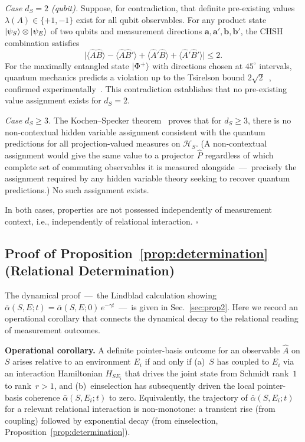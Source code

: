 \textit{Case $d_S = 2$ (qubit).}
Suppose, for contradiction, that definite pre-existing values
$\lambda(A) \in \{+1,-1\}$ exist for all qubit observables.
For any product state $\ket{\psi_S}\otimes\ket{\psi_E}$ of two qubits
and measurement directions $\mathbf{a}, \mathbf{a}', \mathbf{b}, \mathbf{b}'$,
the CHSH combination satisfies
\begin{equation}
  \bigl|\langle\hat{A}\hat{B}\rangle - \langle\hat{A}\hat{B}'\rangle
    + \langle\hat{A}'\hat{B}\rangle + \langle\hat{A}'\hat{B}'\rangle\bigr|
  \leq 2.
\end{equation}
For the maximally entangled state $\ket{\Phi^+}$ with directions chosen at
$45^\circ$ intervals, quantum mechanics predicts a violation up to the
Tsirelson bound $2\sqrt{2}$~\cite{Tsirelson1980}, confirmed
experimentally~\cite{Aspect1982,Zeilinger2022Nobel}.
This contradiction establishes that no pre-existing value assignment exists
for $d_S = 2$.

\textit{Case $d_S \geq 3$.}
The Kochen--Specker theorem~\cite{KochenSpecker1967} proves that for
$d_S \geq 3$, there is no non-contextual hidden variable assignment
consistent with the quantum predictions for all projection-valued
measures on $\mathcal{H}_S$.
(A non-contextual assignment would give the same value to a projector
$\hat{P}$ regardless of which complete set of commuting observables it
is measured alongside~---~precisely the assignment required by any
hidden variable theory seeking to recover quantum predictions.)
No such assignment exists.

In both cases, properties are not possessed independently of measurement
context, i.e., independently of relational interaction. $\square$

\subsection{Proof of Proposition~\ref{prop:determination} (Relational Determination)}

The dynamical proof~---~the Lindblad calculation showing
$\bar\alpha(S,E;t) = \bar\alpha(S,E;0)\,e^{-\gamma t}$~---~is given in
Sec.~\ref{sec:prop2}.
Here we record an operational corollary that connects the dynamical
decay to the relational reading of measurement outcomes.

\textbf{Operational corollary.}
A definite pointer-basis outcome for an observable $\hat{A}$ on $S$
arises relative to an environment $E_i$ if and only if (a)~$S$ has
coupled to $E_i$ via an interaction Hamiltonian $H_{SE_i}$ that drives
the joint state from Schmidt rank~$1$ to rank~$r > 1$, and
(b)~einselection has subsequently driven the local pointer-basis
coherence $\bar\alpha(S,E_i;t)$ to zero.
Equivalently, the trajectory of $\bar\alpha(S,E_i;t)$ for a relevant
relational interaction is non-monotone: a transient rise (from
coupling) followed by exponential decay (from einselection,
Proposition~\ref{prop:determination}).

